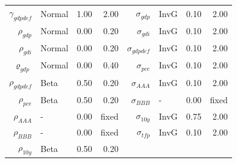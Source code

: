 \documentclass[12pt]{article}
\begin{document}
{\begin{longtable}{rlrr@{\hspace{1in}}rlrr}
$\gamma_{gdpdef}$ & Normal & 1.00 & 2.00 & $\sigma_{gdp}$ & InvG & 0.10 & 2.00 \\
$\rho_{gdp}$ & Normal & 0.00 & 0.20 & $\sigma_{gdi}$ & InvG & 0.10 & 2.00 \\
$\rho_{gdi}$ & Normal & 0.00 & 0.20 & $\sigma_{gdpdef}$ & InvG & 0.10 & 2.00 \\
$\varrho_{gdp}$ & Normal & 0.00 & 0.40 & $\sigma_{pce}$ & InvG & 0.10 & 2.00 \\
$\rho_{gdpdef}$ & Beta & 0.50 & 0.20 & $\sigma_{AAA}$ & InvG & 0.10 & 2.00 \\
$\rho_{pce}$ & Beta & 0.50 & 0.20 & $\sigma_{BBB}$ & - & 0.00 & \scriptsize{fixed} \\
$\rho_{AAA}$ & - & 0.00 & \scriptsize{fixed} & $\sigma_{10y}$ & InvG & 0.75 & 2.00 \\
$\rho_{BBB}$ & - & 0.00 & \scriptsize{fixed} & $\sigma_{tfp}$ & InvG & 0.10 & 2.00 \\
$\rho_{10y}$ & Beta & 0.50 & 0.20 && & & \\[3pt]
\end{longtable}}
\end{document}
